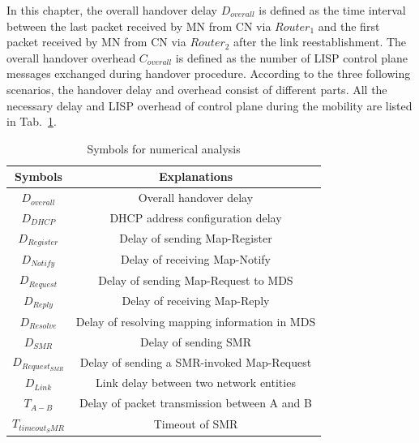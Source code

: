 In this chapter, the overall handover delay $D_{overall}$ is defined as the time interval between the last packet received by MN from CN via $Router_1$ and the first packet received by MN from CN via $Router_2$ after the link reestablishment. The overall handover overhead $C_{overall}$ is defined as the number of LISP control plane messages exchanged during handover procedure.
According to the three following scenarios, the handover delay and overhead consist of different parts. All the necessary delay and LISP overhead of control plane during the mobility are listed in Tab.~\ref{Symbols_numerical_analysis}.
\begin{table}[!tb]
	\centering
	\caption{Symbols for numerical analysis}
	\label{Symbols_numerical_analysis}{
		\begin{tabular}{@{}|c|c|@{}}
			\hline\hline
			Symbols & Explanations   \\ \hline
			$D_{overall}$ & Overall handover delay	\\  \hline    
			$D_{DHCP}$ &  DHCP address configuration delay \\  \hline    
			$D_{Register}$ &  Delay of sending Map-Register      	\\  \hline
			$D_{Notify}$ &  Delay of receiving Map-Notify      	\\  \hline           
			$D_{Request}$ &  Delay of sending Map-Request to MDS      	\\  \hline   
			$D_{Reply}$ &  Delay of receiving Map-Reply      	\\  \hline      
			$D_{Resolve}$ &  Delay of resolving mapping information in MDS      	\\  \hline               
			$D_{SMR}$ &  Delay of sending SMR       	\\  \hline 
			$D_{Request_{SMR}}$ &  Delay of sending a SMR-invoked Map-Request \\  \hline 
			$D_{Link}$ &  Link delay between two network entities \\  \hline 
			$T_{A-B}$ &  Delay of packet transmission between A and B     	\\  \hline
			$T_{timeout_SMR}$ &  Timeout of SMR \\  \hline  \hline    
		\end{tabular}
	}
\end{table}



